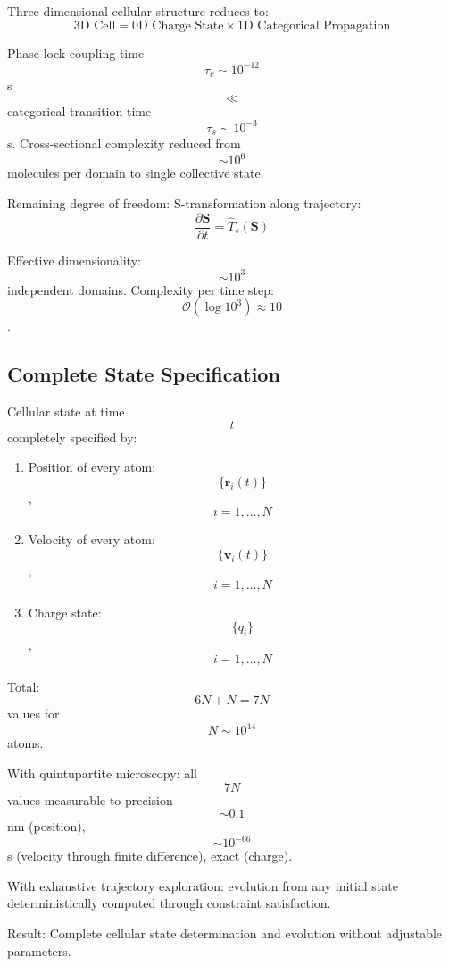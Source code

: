 \documentclass[11pt,twocolumn,a4paper]{article}
\theoremstyle{remark}
\begin{document}
Three-dimensional cellular structure reduces to:
$$
\text{3D Cell} = \text{0D Charge State} \times \text{1D Categorical Propagation}
$$

Phase-lock coupling time $$\tau_c \sim 10^{-12}$$ s $$\ll$$ categorical transition time $$\tau_s \sim 10^{-3}$$ s. Cross-sectional complexity reduced from $$\sim 10^6$$ molecules per domain to single collective state.

Remaining degree of freedom: S-transformation along trajectory:
$$
\frac{\partial \mathbf{S}}{\partial t} = \hat{T}_s(\mathbf{S})
$$

Effective dimensionality: $$\sim 10^3$$ independent domains. Complexity per time step: $$\mathcal{O}(\log 10^3) \approx 10$$.

\subsection{Complete State Specification}

Cellular state at time $$t$$ completely specified by:
\begin{enumerate}
\item Position of every atom: $$\{\mathbf{r}_i(t)\}$$, $$i = 1, \ldots, N$$
\item Velocity of every atom: $$\{\mathbf{v}_i(t)\}$$, $$i = 1, \ldots, N$$
\item Charge state: $$\{q_i\}$$, $$i = 1, \ldots, N$$
\end{enumerate}

Total: $$6N + N = 7N$$ values for $$N \sim 10^{14}$$ atoms.

With quintupartite microscopy: all $$7N$$ values measurable to precision $$\sim 0.1$$ nm (position), $$\sim 10^{-66}$$ s (velocity through finite difference), exact (charge).

With exhaustive trajectory exploration: evolution from any initial state deterministically computed through constraint satisfaction.

Result: Complete cellular state determination and evolution without adjustable parameters.
\end{document}
